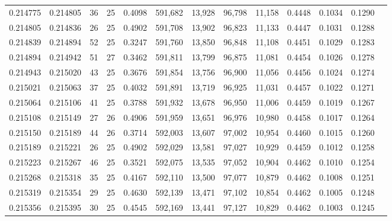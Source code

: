 \begin{tabular}{rrrrrrrrrrrrr}
0.214775 & 0.214805 &  36 &  25 &                                     0.4098 & 591,682 &  13,928 &  96,798 &  11,158 & 0.4448 & 0.1034 & 0.1290 \\
0.214805 & 0.214836 &  26 &  25 &                                     0.4902 & 591,708 &  13,902 &  96,823 &  11,133 & 0.4447 & 0.1031 & 0.1288 \\
0.214839 & 0.214894 &  52 &  25 &                                     0.3247 & 591,760 &  13,850 &  96,848 &  11,108 & 0.4451 & 0.1029 & 0.1283 \\
0.214894 & 0.214942 &  51 &  27 &                                     0.3462 & 591,811 &  13,799 &  96,875 &  11,081 & 0.4454 & 0.1026 & 0.1278 \\
0.214943 & 0.215020 &  43 &  25 &                                     0.3676 & 591,854 &  13,756 &  96,900 &  11,056 & 0.4456 & 0.1024 & 0.1274 \\
0.215021 & 0.215063 &  37 &  25 &                                     0.4032 & 591,891 &  13,719 &  96,925 &  11,031 & 0.4457 & 0.1022 & 0.1271 \\
0.215064 & 0.215106 &  41 &  25 &                                     0.3788 & 591,932 &  13,678 &  96,950 &  11,006 & 0.4459 & 0.1019 & 0.1267 \\
0.215108 & 0.215149 &  27 &  26 &                                     0.4906 & 591,959 &  13,651 &  96,976 &  10,980 & 0.4458 & 0.1017 & 0.1264 \\
0.215150 & 0.215189 &  44 &  26 &                                     0.3714 & 592,003 &  13,607 &  97,002 &  10,954 & 0.4460 & 0.1015 & 0.1260 \\
0.215189 & 0.215221 &  26 &  25 &                                     0.4902 & 592,029 &  13,581 &  97,027 &  10,929 & 0.4459 & 0.1012 & 0.1258 \\
0.215223 & 0.215267 &  46 &  25 &                                     0.3521 & 592,075 &  13,535 &  97,052 &  10,904 & 0.4462 & 0.1010 & 0.1254 \\
0.215268 & 0.215318 &  35 &  25 &                                     0.4167 & 592,110 &  13,500 &  97,077 &  10,879 & 0.4462 & 0.1008 & 0.1251 \\
0.215319 & 0.215354 &  29 &  25 &                                     0.4630 & 592,139 &  13,471 &  97,102 &  10,854 & 0.4462 & 0.1005 & 0.1248 \\
0.215356 & 0.215395 &  30 &  25 &                                     0.4545 & 592,169 &  13,441 &  97,127 &  10,829 & 0.4462 & 0.1003 & 0.1245 \\

\end{tabular}

